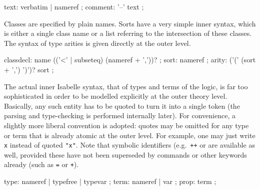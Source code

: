 \begin{isabellebody}
\begin{isamarkuptext}
  \begin{rail}
    text: verbatim | nameref
    ;
    comment: '--' text
    ;
  \end{rail}%
\end{isamarkuptext}%
\isamarkuptrue%
%
\isamarkuptrue%
%
\begin{isamarkuptext}%
Classes are specified by plain names.  Sorts have a very simple
  inner syntax, which is either a single class name  or a
  list  referring to the
  intersection of these classes.  The syntax of type arities is given
  directly at the outer level.

  \begin{rail}
    classdecl: name (('<' | subseteq) (nameref + ','))?
    ;
    sort: nameref
    ;
    arity: ('(' (sort + ',') ')')? sort
    ;
  \end{rail}%
\end{isamarkuptext}%
\isamarkuptrue%
%
\isamarkuptrue%
%
\begin{isamarkuptext}%
The actual inner Isabelle syntax, that of types and terms of the
  logic, is far too sophisticated in order to be modelled explicitly
  at the outer theory level.  Basically, any such entity has to be
  quoted to turn it into a single token (the parsing and type-checking
  is performed internally later).  For convenience, a slightly more
  liberal convention is adopted: quotes may be omitted for any type or
  term that is already atomic at the outer level.  For example, one
  may just write \verb|x| instead of quoted \verb|"x"|.
  Note that symbolic identifiers (e.g.\ \verb|++| or \isa{{\isachardoublequote}{\isasymforall}{\isachardoublequote}} are available as well, provided these have not been superseded
  by commands or other keywords already (such as \verb|=| or
  \verb|+|).

  \begin{rail}
    type: nameref | typefree | typevar
    ;
    term: nameref | var
    ;
    prop: term
    ;
  \end{rail}


\end{isamarkuptext}
\end{isabellebody}
